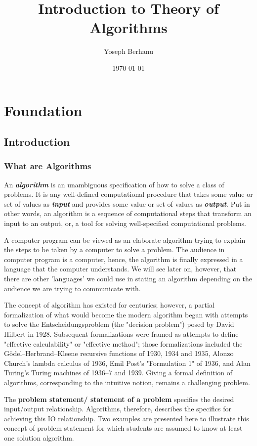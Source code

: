 \documentclass[12pt,a4paper]{book}
\title{Introduction to Theory of Algorithms}
\author{Yoseph Berhanu}
\date{\today}
\begin{document}
\maketitle
\tableofcontents
\part{Foundation}
\chapter{Introduction}
\section{What are Algorithms}
An \textbf{\textit{algorithm}} is an unambiguous specification of how to solve a class of problems. It is any well-defined computational procedure that takes some value or set of values as \textbf{\textit{input}} and provides some value or set of values as \textbf{\textit{output}}. Put in other words, an algorithm is a sequence of computational steps that transform an input to an output, or, a tool for solving well-specified computational problems.
\par A computer program can be viewed as an elaborate algorithm trying to explain the steps to be taken by a computer to solve a problem. The audience in computer program is a computer, hence, the algorithm is finally expressed in a language that the computer understands. We will see later on, however, that there are other 'languages' we could use in stating an algorithm depending on the audience we are trying to communicate with.
\par The concept of algorithm has existed for centuries; however, a partial formalization of what would become the modern algorithm began with attempts to solve the Entscheidungsproblem (the "decision problem") posed by David Hilbert in 1928. Subsequent formalizations were framed as attempts to define "effective calculability" or "effective method"; those formalizations included the Gödel–Herbrand–Kleene recursive functions of 1930, 1934 and 1935, Alonzo Church's lambda calculus of 1936, Emil Post's "Formulation 1" of 1936, and Alan Turing's Turing machines of 1936–7 and 1939. Giving a formal definition of algorithms, corresponding to the intuitive notion, remains a challenging problem.
\par The \textbf{problem statement/ statement of a problem} specifies the desired input/output relationship. Algorithms, therefore, describes the specifics for achieving this IO relationship. Two examples are presented here to illustrate this concept of problem statement for which students are assumed to know at least one solution algorithm.
\\
\end{document}
